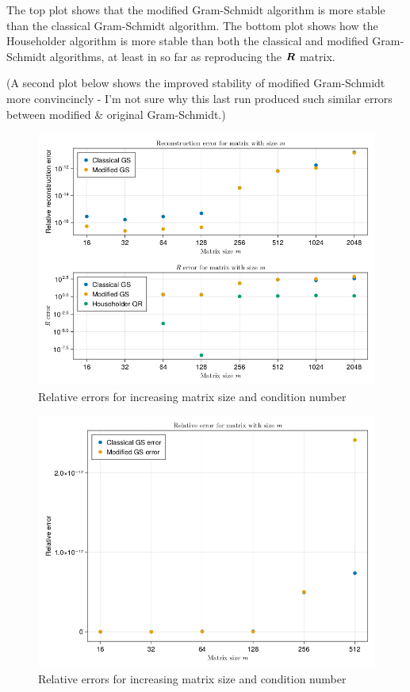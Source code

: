 \documentclass[twoside,10pt]{article}
\begin{document}
The top plot shows that the modified Gram-Schmidt algorithm is more stable than the classical Gram-Schmidt algorithm.
The bottom plot shows how the Householder algorithm is more stable than both the classical and modified Gram-Schmidt algorithms, at least in so far as reproducing the $\bm{R}$ matrix.

(A second plot below shows the improved stability of modified Gram-Schmidt more convincincly - I'm not sure why this last run produced such similar errors between modified & original Gram-Schmidt.)

\begin{figure}[htb]
  \begin{center}
  \includegraphics[width=120mm]{HW4_code/error_compare.png}
  \end{center}
  \caption{Relative errors for increasing matrix size and condition number}
  \label{fig:figure1}
\end{figure}

\begin{figure}[htb]
  \begin{center}
  \includegraphics[width=120mm]{HW4_code/error_compare_1.png}
  \end{center}
  \caption{Relative errors for increasing matrix size and condition number}
  \label{fig:figure2}
\end{figure}
\end{document}
